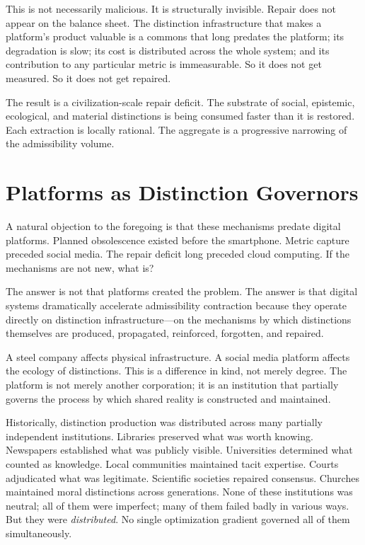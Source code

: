 \documentclass[11pt, letterpaper]{article}
\begin{document}
This is not necessarily malicious. It is structurally invisible. Repair does not appear on the balance sheet. The distinction infrastructure that makes a platform's product valuable is a commons that long predates the platform; its degradation is slow; its cost is distributed across the whole system; and its contribution to any particular metric is immeasurable. So it does not get measured. So it does not get repaired.

The result is a civilization-scale repair deficit. The substrate of social, epistemic, ecological, and material distinctions is being consumed faster than it is restored. Each extraction is locally rational. The aggregate is a progressive narrowing of the admissibility volume.

\section{Platforms as Distinction Governors}

A natural objection to the foregoing is that these mechanisms predate digital platforms. Planned obsolescence existed before the smartphone. Metric capture preceded social media. The repair deficit long preceded cloud computing. If the mechanisms are not new, what is?

The answer is not that platforms created the problem. The answer is that digital systems dramatically accelerate admissibility contraction because they operate directly on distinction infrastructure---on the mechanisms by which distinctions themselves are produced, propagated, reinforced, forgotten, and repaired.

A steel company affects physical infrastructure. A social media platform affects the ecology of distinctions. This is a difference in kind, not merely degree. The platform is not merely another corporation; it is an institution that partially governs the process by which shared reality is constructed and maintained.

Historically, distinction production was distributed across many partially independent institutions. Libraries preserved what was worth knowing. Newspapers established what was publicly visible. Universities determined what counted as knowledge. Local communities maintained tacit expertise. Courts adjudicated what was legitimate. Scientific societies repaired consensus. Churches maintained moral distinctions across generations. None of these institutions was neutral; all of them were imperfect; many of them failed badly in various ways. But they were \emph{distributed}. No single optimization gradient governed all of them simultaneously.
\end{document}
